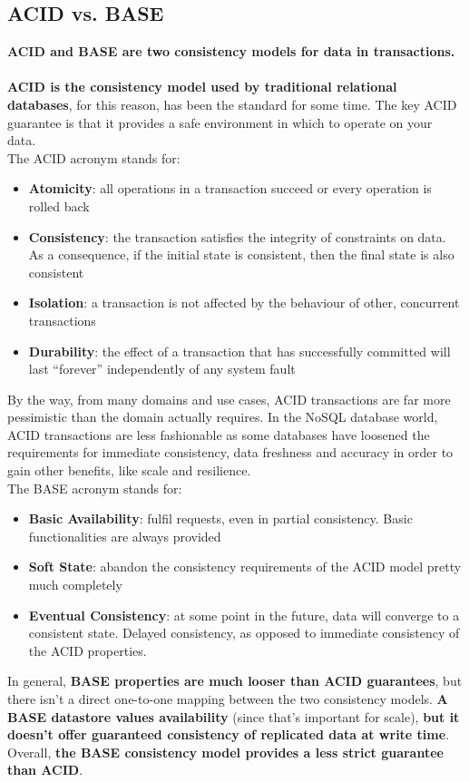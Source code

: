 \documentclass[10pt,a4paper]{article}
\newcommand{\nline}{\\~\\}
\begin{document}
\subsection{ACID vs. BASE}
\textbf{ACID and BASE are two consistency models for data in transactions.}
\nline
\textbf{ACID is the consistency model used by traditional relational databases}, for this reason, has been the standard for some time. The key ACID guarantee is that it provides a safe environment in which to operate on your data. \\
The ACID acronym stands for:
\begin{itemize}
	\item \textbf{Atomicity}: all operations in a transaction succeed or every operation is rolled back
	\item \textbf{Consistency}: the transaction satisfies the integrity of constraints on data. As a consequence, if the initial state is consistent, then the final state is also consistent
	\item \textbf{Isolation}: a transaction is not affected by the behaviour of other, concurrent transactions
	\item \textbf{Durability}: the effect of a transaction that has successfully committed will last “forever” independently of any system fault
\end{itemize}
By the way, from many domains and use cases, ACID transactions are far more pessimistic than the domain actually requires. In the NoSQL database world, ACID transactions are less fashionable as some databases have loosened the requirements for immediate consistency, data freshness and accuracy in order to gain other benefits, like scale and resilience. \\
The BASE acronym stands for:
\begin{itemize}
	\item \textbf{Basic Availability}: fulfil requests, even in partial consistency. Basic functionalities are always provided
	\item \textbf{Soft State}: abandon the consistency requirements of the ACID model pretty much completely
	\item \textbf{Eventual Consistency}: at some point in the future, data will converge to a consistent state. Delayed consistency, as opposed to immediate consistency of the ACID properties.
\end{itemize}
In general, \textbf{BASE properties are much looser than ACID guarantees}, but there isn’t a direct one-to-one mapping between the two consistency models. \textbf{A BASE datastore values availability} (since that’s important for scale), \textbf{but it doesn’t offer guaranteed consistency of replicated data at write time}. Overall, \textbf{the BASE consistency model provides a less strict guarantee than ACID}.
\end{document}
